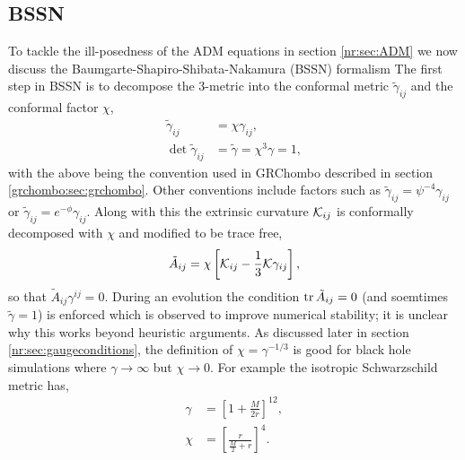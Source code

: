 \subsection{BSSN} \label{nr:sec:bssn}
To tackle the ill-posedness of the ADM equations in section \ref{nr:sec:ADM} we now discuss the Baumgarte-Shapiro-Shibata-Nakamura (BSSN) formalism \cite{Baumgarte:1998te} The first step in BSSN is to decompose the 3-metric into the conformal metric $\tilde{\gamma}_{ij}$ and the conformal factor $\chi$,
\begin{align} 
\tilde{\gamma}_{ij} &= \chi \gamma_{ij},\\
 \det{\tilde{\gamma}_{ij}} &= \tilde{\gamma} = \chi^3\gamma = 1,
\end{align}
with the above being the convention used in GRChombo described in section \ref{grchombo:sec:grchombo}. Other conventions include factors such as
$\tilde{\gamma}_{ij} = \psi^{-4}\gamma_{ij}$ or $\tilde{\gamma}_{ij} =e^{-\phi}\gamma_{ij}$.
Along with this the extrinsic curvature $\mathcal{K}_{ij}$ is conformally decomposed with $\chi$ and modified to be trace free,
\begin{equation} \tilde{A}_{ij} = \chi\left[ \mathcal{K}_{ij}-\frac{1}{3}\mathcal{K}\gamma_{ij}\right], \end{equation} so that $\tilde{A}_{ij}\gamma^{ij}=0$.
During an evolution the condition $\trace{\tilde{A}_{ij}=0}$ (and soemtimes $\tilde{\gamma}=1$) is enforced which is observed to improve numerical stability; it is unclear why this works beyond heuristic arguments. As discussed later in section \ref{nr:sec:gaugeconditions}, the definition of $\chi = \gamma^{-1/3}$ is good for black hole simulations where $\gamma\rightarrow\infty$ but $\chi \rightarrow 0$. For example the isotropic Schwarzschild metric has, 
\begin{align}
\gamma &= \left[ 1+ \frac{M}{2r}\right]^{12},\\
\chi &=\left[ \frac{r}{\frac{M}{2} + r}\right]^4.
\end{align} 

